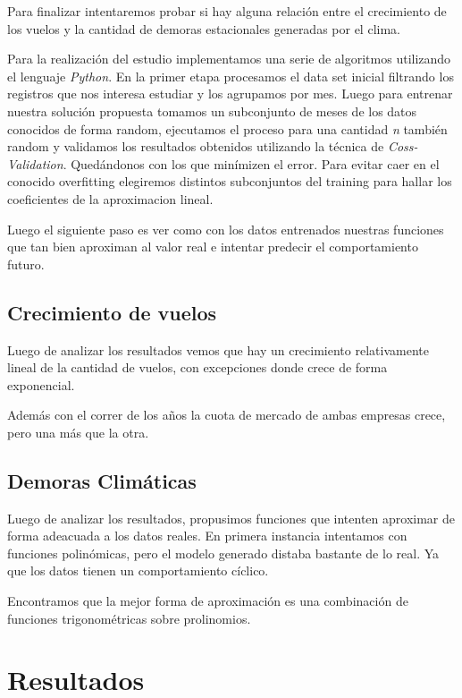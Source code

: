 \documentclass{endm}
\begin{document}
Para finalizar intentaremos probar si hay alguna relaci\'on entre el crecimiento de los vuelos y la cantidad de demoras estacionales generadas por el clima.

Para la realizaci\'on del estudio implementamos una serie de algoritmos utilizando el lenguaje \textit{Python}. En la primer etapa procesamos el data set inicial filtrando los registros que nos interesa estudiar y los agrupamos por mes. Luego para entrenar nuestra soluci\'on propuesta tomamos un subconjunto de meses de los datos conocidos de forma random, ejecutamos el proceso para una cantidad \textit{n} tambi\'en random y validamos los resultados obtenidos utilizando la t\'ecnica de \textit{Coss-Validation}. Qued\'andonos con los que min\'imizen el error. Para evitar caer en el conocido overfitting elegiremos distintos subconjuntos del training para hallar los coeficientes de la aproximacion lineal.

Luego el siguiente paso es ver como con los datos entrenados nuestras funciones que tan bien aproximan al valor real e intentar predecir el comportamiento futuro.

\subsection{Crecimiento de vuelos}

Luego de analizar los resultados vemos que hay un crecimiento relativamente lineal de la cantidad de vuelos, con excepciones donde crece de forma exponencial.

Además con el correr de los años la cuota de mercado de ambas empresas crece, pero una m\'as que la otra.


\subsection{Demoras Clim\'aticas}

Luego de analizar los resultados, propusimos funciones que intenten aproximar de forma adeacuada a los datos reales. En primera instancia intentamos con funciones polin\'omicas, pero el modelo generado distaba bastante de lo real. Ya que los datos tienen un comportamiento c\'iclico.

Encontramos que la mejor forma de aproximaci\'on es una combinaci\'on de funciones trigonom\'etricas sobre prolinomios.



\section{Resultados}
\end{document}
